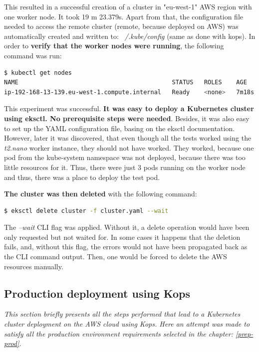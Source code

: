 This resulted in a successful creation of a cluster in "eu-west-1" AWS region with one worker node. It took 19 m 23.379s. Apart from that, the configuration file needed to access the remote cluster (remote, because deployed on AWS) was automatically created and written to: \textit{~/.kube/config} (same as done with kops). In order to \textbf{verify that the worker nodes were running}, the following command was run:
\begin{lstlisting}[basicstyle=\tiny,caption={Command used to list Kubernetes worker nodes to verify that one such node was running},captionpos=b,language=Bash,xleftmargin=1cm]
$ kubectl get nodes
NAME                                           STATUS   ROLES    AGE     VERSION
ip-192-168-13-139.eu-west-1.compute.internal   Ready    <none>   7m18s   v1.16.8-eks-e16311
\end{lstlisting}

This experiment was successful. \textbf{It was easy to deploy a Kubernetes cluster using eksctl. No prerequisite steps were needed}. Besides, it was also easy to set up the YAML configuration file, basing on the eksctl documentation\cite{eksctl-creating-clusters}. However, later it was discovered, that even though all the tests worked using the \textit{t2.nano} worker instance, they should not have worked. They worked, because one pod from the kube-system namespace was not deployed, because there was too little resources for it. Thus, there were just 3 pods running on the worker node and thus, there was a place to deploy the test pod.


\textbf{The cluster was then deleted} with the following command:
\begin{lstlisting}[basicstyle=\tiny,caption={Command used to delete Kubernetes cluster with eksctl},captionpos=b,language=Bash,xleftmargin=1cm]
$ eksctl delete cluster -f cluster.yaml --wait
\end{lstlisting}

The \textit{--wait} CLI flag was applied. Without it, a delete operation would have been only requested but not waited for. In some cases it happens that the deletion fails, and, without this flag, the errors would not have been propagated back as the CLI command output. Then, one would be forced to delete the AWS resources manually\cite{eksctl-creating-clusters}.


\subsection{Production deployment using Kops}
\textit{This section briefly presents all the steps performed that lead to a Kubernetes cluster deployment on the AWS cloud using Kops. Here an attempt was made to satisfy all the production environment requirements selected in the chapter: \ref{prep-prod}.}
\\

